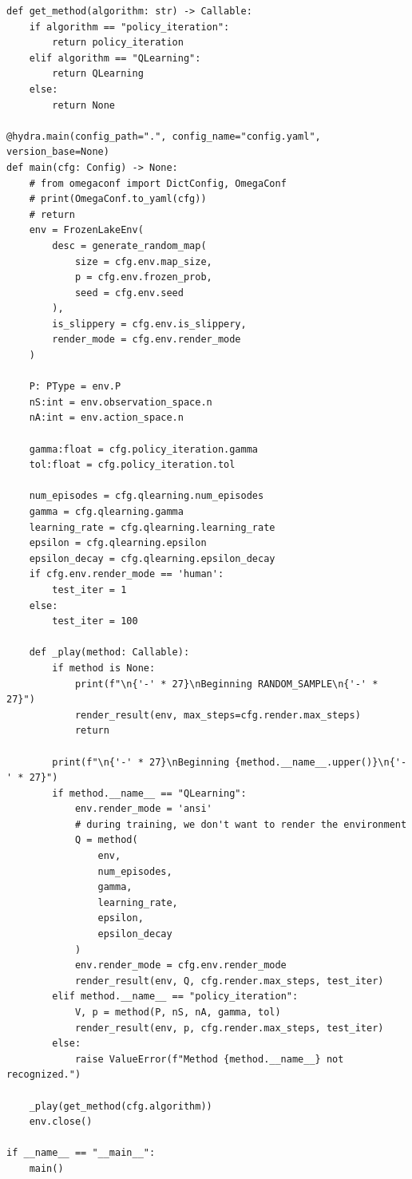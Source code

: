 \documentclass[a4paper,12pt]{article}
\begin{document}
\begin{appendices}
\begin{verbatim}
def get_method(algorithm: str) -> Callable:
    if algorithm == "policy_iteration":
        return policy_iteration
    elif algorithm == "QLearning":
        return QLearning
    else:
        return None

@hydra.main(config_path=".", config_name="config.yaml", version_base=None)
def main(cfg: Config) -> None:
    # from omegaconf import DictConfig, OmegaConf
    # print(OmegaConf.to_yaml(cfg))
    # return    
    env = FrozenLakeEnv(
        desc = generate_random_map(
            size = cfg.env.map_size, 
            p = cfg.env.frozen_prob,
            seed = cfg.env.seed
        ),
        is_slippery = cfg.env.is_slippery,
        render_mode = cfg.env.render_mode
    )

    P: PType = env.P
    nS:int = env.observation_space.n
    nA:int = env.action_space.n

    gamma:float = cfg.policy_iteration.gamma
    tol:float = cfg.policy_iteration.tol

    num_episodes = cfg.qlearning.num_episodes
    gamma = cfg.qlearning.gamma
    learning_rate = cfg.qlearning.learning_rate
    epsilon = cfg.qlearning.epsilon
    epsilon_decay = cfg.qlearning.epsilon_decay
    if cfg.env.render_mode == 'human':
        test_iter = 1
    else:
        test_iter = 100

    def _play(method: Callable):
        if method is None:
            print(f"\n{'-' * 27}\nBeginning RANDOM_SAMPLE\n{'-' * 27}")
            render_result(env, max_steps=cfg.render.max_steps)
            return

        print(f"\n{'-' * 27}\nBeginning {method.__name__.upper()}\n{'-' * 27}")
        if method.__name__ == "QLearning":
            env.render_mode = 'ansi'
            # during training, we don't want to render the environment
            Q = method(
                env, 
                num_episodes, 
                gamma, 
                learning_rate, 
                epsilon, 
                epsilon_decay
            )
            env.render_mode = cfg.env.render_mode
            render_result(env, Q, cfg.render.max_steps, test_iter)
        elif method.__name__ == "policy_iteration":
            V, p = method(P, nS, nA, gamma, tol)
            render_result(env, p, cfg.render.max_steps, test_iter)
        else:
            raise ValueError(f"Method {method.__name__} not recognized.")
    
    _play(get_method(cfg.algorithm))
    env.close()

if __name__ == "__main__":
    main()
    

\end{verbatim}
\end{appendices}
\end{document}
